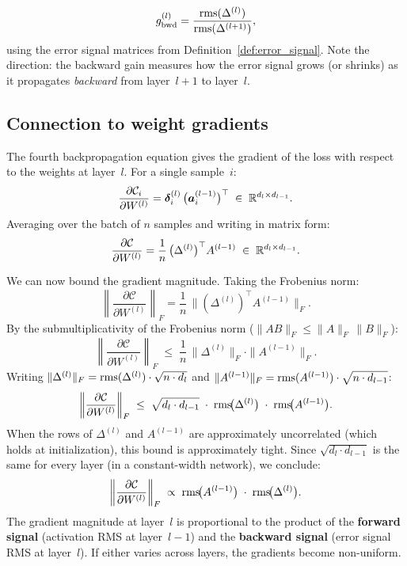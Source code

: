 \begin{definition}
\label{def:bwd_gain}
\begin{equation}\label{eq:bwd_gain}
  g_{\mathrm{bwd}}^{(l)}
  = \frac{\operatorname{rms}(\Delta^{(l)})}{\operatorname{rms}(\Delta^{(l+1)})},
\end{equation}
using the error signal matrices from
Definition~\ref{def:error_signal}.
Note the direction: the backward gain measures how the error
signal grows (or shrinks) as it propagates \emph{backward}
from layer~$l+1$ to layer~$l$.
\end{definition}

\subsection{Connection to weight gradients}
\label{sec:connection_grad}

The fourth backpropagation equation gives the gradient of the loss
with respect to the weights at layer~$l$.  For a single sample~$i$:
\[
  \frac{\partial \mathcal{C}_i}{\partial W^{(l)}}
  = \bm{\delta}^{(l)}_i \,\bigl(\bm{a}^{(l-1)}_i\bigr)^\top
  \;\in\; \mathbb{R}^{d_l \times d_{l-1}}.
\]
Averaging over the batch of $n$ samples and writing in matrix form:
\begin{equation}\label{eq:bp4}
  \frac{\partial \mathcal{C}}{\partial W^{(l)}}
  = \frac{1}{n}\,
    \bigl(\Delta^{(l)}\bigr)^\top A^{(l-1)}
  \;\in\; \mathbb{R}^{d_l \times d_{l-1}}.
\end{equation}

We can now bound the gradient magnitude.  Taking the Frobenius norm:
\[
  \left\|\frac{\partial \mathcal{C}}{\partial W^{(l)}}\right\|_F
  = \frac{1}{n}\,
    \bigl\|(\Delta^{(l)})^\top A^{(l-1)}\bigr\|_F.
\]
By the submultiplicativity of the Frobenius norm
($\|AB\|_F \leq \|A\|_F\,\|B\|_F$):
\[
  \left\|\frac{\partial \mathcal{C}}{\partial W^{(l)}}\right\|_F
  \;\leq\;
  \frac{1}{n}\,
  \|\Delta^{(l)}\|_F \cdot \|A^{(l-1)}\|_F.
\]
Writing $\|\Delta^{(l)}\|_F = \operatorname{rms}(\Delta^{(l)}) \cdot \sqrt{n \cdot d_l}$
and $\|A^{(l-1)}\|_F = \operatorname{rms}(A^{(l-1)}) \cdot \sqrt{n \cdot d_{l-1}}$:
\begin{equation}\label{eq:grad_magnitude}
  \left\|\frac{\partial \mathcal{C}}{\partial W^{(l)}}\right\|_F
  \;\leq\;
  \sqrt{d_l \cdot d_{l-1}}\;\cdot\;
  \operatorname{rms}\!\bigl(\Delta^{(l)}\bigr) \;\cdot\;
  \operatorname{rms}\!\bigl(A^{(l-1)}\bigr).
\end{equation}
When the rows of $\Delta^{(l)}$ and $A^{(l-1)}$ are approximately
uncorrelated (which holds at initialization), this bound is
approximately tight.  Since $\sqrt{d_l \cdot d_{l-1}}$ is the same
for every layer (in a constant-width network), we conclude:
\begin{equation}\label{eq:grad_proportional}
  \left\|\frac{\partial \mathcal{C}}{\partial W^{(l)}}\right\|_F
  \;\propto\;
  \operatorname{rms}\!\bigl(A^{(l-1)}\bigr) \;\cdot\;
  \operatorname{rms}\!\bigl(\Delta^{(l)}\bigr).
\end{equation}
The gradient magnitude at layer~$l$ is proportional to the product
of the \textbf{forward signal} (activation RMS at layer~$l-1$) and
the \textbf{backward signal} (error signal RMS at layer~$l$).
If either varies across layers, the gradients become non-uniform.

